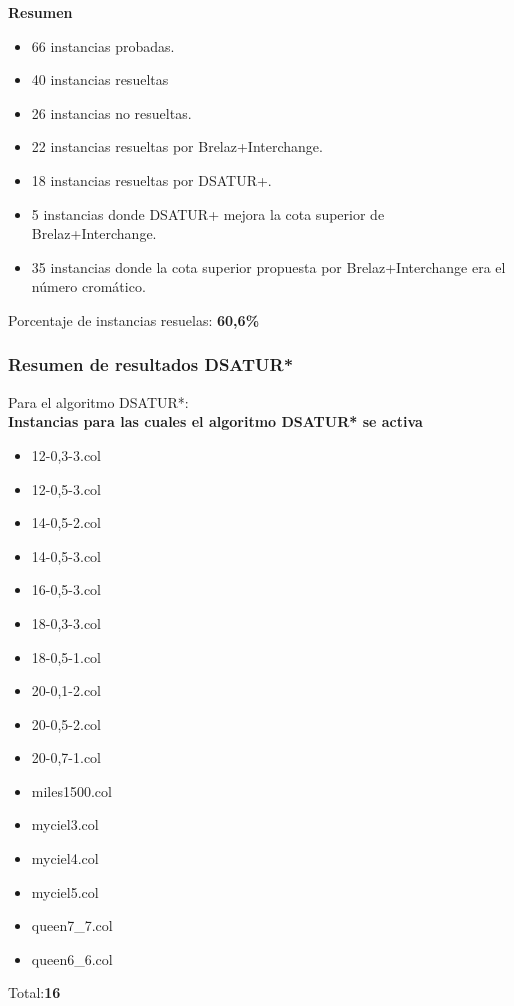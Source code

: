 \documentclass[a4paper,10pt]{article}
\begin{document}
\textbf{Resumen}
\begin{itemize}
 \item 66 instancias probadas.
 \item 40 instancias resueltas
 \item 26 instancias no resueltas.
 \item 22 instancias resueltas por Brelaz+Interchange.
 \item 18 instancias resueltas por DSATUR+.
 \item 5 instancias donde DSATUR+ mejora la cota superior de
       Brelaz+Interchange.
 \item 35 instancias donde la cota superior propuesta por
       Brelaz+Interchange era el n\'umero crom\'atico.
\end{itemize}
\indent Porcentaje de instancias resuelas: \textbf{60,6\%}




\subsubsection{Resumen de resultados DSATUR*}
Para el algoritmo DSATUR*:\\
\textbf{Instancias para las cuales el algoritmo DSATUR* se activa}
\begin{itemize}
\item 12-0,3-3.col
\item 12-0,5-3.col
\item 14-0,5-2.col
\item 14-0,5-3.col
\item 16-0,5-3.col
\item 18-0,3-3.col
\item 18-0,5-1.col
\item 20-0,1-2.col
\item 20-0,5-2.col
\item 20-0,7-1.col
\item miles1500.col
\item myciel3.col
\item myciel4.col
\item myciel5.col
\item queen7_7.col
\item queen6_6.col

\end{itemize}
\indent Total:\textbf{16}\\
\end{document}
